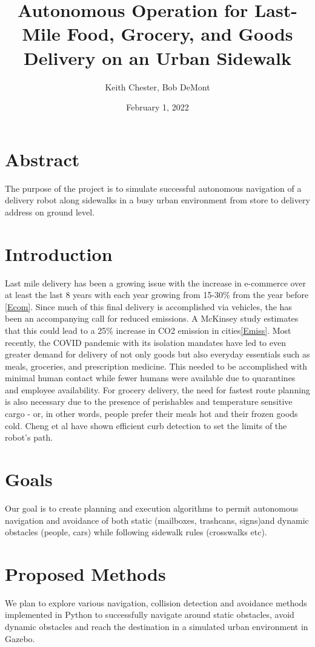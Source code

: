 \documentclass{article}
\title{Autonomous Operation for Last-Mile Food, Grocery, and Goods Delivery on an Urban Sidewalk }
\author{Keith Chester, Bob DeMont}
\date{February 1, 2022}
\begin{document}
\maketitle


\begin{multicols}{2}
\section*{Abstract}
The purpose of the project is to simulate successful autonomous navigation of a delivery robot along sidewalks in a busy urban environment from store to delivery address on ground level.

\section*{Introduction}
Last mile delivery has been a growing issue with the increase in e-commerce over at least the last 8 years with each year growing from 15-30\% from the year before \ref{Ecom}.  Since much of this final delivery is accomplished via vehicles, the has been an accompanying call for reduced emissions.  A McKinsey study estimates that this could lead to a 25\% increase in CO2 emission in cities\ref{Emiss}.  Most recently, the COVID pandemic with its isolation mandates have led to even greater demand for delivery of not only goods but also everyday essentials such as meals, groceries, and prescription medicine.  This needed to be accomplished with minimal human contact while fewer humans were available due to quarantines and employee availability.  For grocery delivery, the need for fastest route planning is also necessary due to the presence of perishables and temperature sensitive cargo - or, in other words, people prefer their meals hot and their frozen goods cold. Cheng et al  have shown efficient curb detection to set the limits of the robot's path.

\section*{Goals}
Our goal is to create planning and execution algorithms to permit autonomous navigation and avoidance of both static (mailboxes, trashcans, signs)and dynamic obstacles (people, cars) while following sidewalk rules (crosswalks etc).

\section*{Proposed Methods}
We plan to explore various navigation, collision detection and avoidance methods implemented in Python to successfully navigate around static obstacles, avoid dynamic obstacles  and reach the destination in a simulated urban environment in Gazebo.


\end{multicols}
\end{document}
